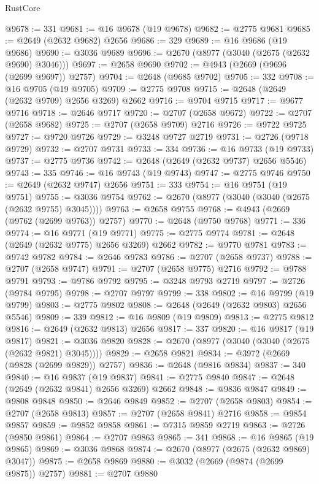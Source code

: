 \begin{lexlean}{RustCore}
\begin{coremodule}
@9678 := 331
@9681 := @16 @9678 (@19 @9678)
@9682 := @2775 @9681
@9685 := @2649 (@2632 @9682) @2656
@9686 := 329
@9689 := @16 @9686 (@19 @9686)
@9690 := @3036 @9689
@9696 := @2670 (@8977 (@3040 (@2675 (@2632 @9690) @3046)))
@9697 := @2658 @9690
@9702 := @4943 (@2669 (@9696 (@2699 @9697)) @2757)
@9704 := @2648 (@9685 @9702)
@9705 := 332
@9708 := @16 @9705 (@19 @9705)
@9709 := @2775 @9708
@9715 := @2648 (@2649 (@2632 @9709) @2656 @3269) @2662
@9716 := @9704 @9715
@9717 := @9677 @9716
@9718 := @2646 @9717
@9720 := @2707 (@2658 @9672)
@9722 := @2707 (@2658 @9682)
@9725 := @2707 (@2658 @9709) @2716
@9726 := @9722 @9725
@9727 := @9720 @9726
@9729 := @3248 @9727 @2719
@9731 := @2726 (@9718 @9729)
@9732 := @2707 @9731
@9733 := 334
@9736 := @16 @9733 (@19 @9733)
@9737 := @2775 @9736
@9742 := @2648 (@2649 (@2632 @9737) @2656 @5546)
@9743 := 335
@9746 := @16 @9743 (@19 @9743)
@9747 := @2775 @9746
@9750 := @2649 (@2632 @9747) @2656
@9751 := 333
@9754 := @16 @9751 (@19 @9751)
@9755 := @3036 @9754
@9762 := @2670 (@8977 (@3040 (@3040 (@2675 (@2632 @9755) @3045))))
@9763 := @2658 @9755
@9768 := @4943 (@2669 (@9762 (@2699 @9763)) @2757)
@9770 := @2648 (@9750 @9768)
@9771 := 336
@9774 := @16 @9771 (@19 @9771)
@9775 := @2775 @9774
@9781 := @2648 (@2649 (@2632 @9775) @2656 @3269) @2662
@9782 := @9770 @9781
@9783 := @9742 @9782
@9784 := @2646 @9783
@9786 := @2707 (@2658 @9737)
@9788 := @2707 (@2658 @9747)
@9791 := @2707 (@2658 @9775) @2716
@9792 := @9788 @9791
@9793 := @9786 @9792
@9795 := @3248 @9793 @2719
@9797 := @2726 (@9784 @9795)
@9798 := @2707 @9797
@9799 := 338
@9802 := @16 @9799 (@19 @9799)
@9803 := @2775 @9802
@9808 := @2648 (@2649 (@2632 @9803) @2656 @5546)
@9809 := 339
@9812 := @16 @9809 (@19 @9809)
@9813 := @2775 @9812
@9816 := @2649 (@2632 @9813) @2656
@9817 := 337
@9820 := @16 @9817 (@19 @9817)
@9821 := @3036 @9820
@9828 := @2670 (@8977 (@3040 (@3040 (@2675 (@2632 @9821) @3045))))
@9829 := @2658 @9821
@9834 := @3972 (@2669 (@9828 (@2699 @9829)) @2757)
@9836 := @2648 (@9816 @9834)
@9837 := 340
@9840 := @16 @9837 (@19 @9837)
@9841 := @2775 @9840
@9847 := @2648 (@2649 (@2632 @9841) @2656 @3269) @2662
@9848 := @9836 @9847
@9849 := @9808 @9848
@9850 := @2646 @9849
@9852 := @2707 (@2658 @9803)
@9854 := @2707 (@2658 @9813)
@9857 := @2707 (@2658 @9841) @2716
@9858 := @9854 @9857
@9859 := @9852 @9858
@9861 := @7315 @9859 @2719
@9863 := @2726 (@9850 @9861)
@9864 := @2707 @9863
@9865 := 341
@9868 := @16 @9865 (@19 @9865)
@9869 := @3036 @9868
@9874 := @2670 (@8977 (@2675 (@2632 @9869) @3047))
@9875 := @2658 @9869
@9880 := @3032 (@2669 (@9874 (@2699 @9875)) @2757)
@9881 := @2707 @9880

\end{coremodule}
\end{lexlean}
